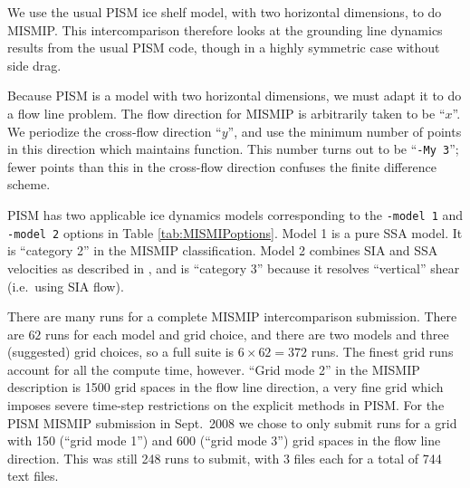 \documentclass[11pt,final]{amsart}
\begin{document}
We use the usual PISM ice shelf model, with two horizontal dimensions, to do MISMIP.  This intercomparison therefore looks at the grounding line dynamics results from the usual PISM code, though in a highly symmetric case without side drag.

Because PISM is a model with two horizontal dimensions, we must adapt it to do a flow line problem.  The flow direction for MISMIP is arbitrarily taken to be ``$x$''.  We periodize the cross-flow direction ``$y$'', and use the minimum number of points in this direction which maintains function.  This number turns out to be ``\verb|-My 3|''; fewer points than this in the cross-flow direction confuses the finite difference scheme.

PISM has two applicable ice dynamics models corresponding to the \verb|-model 1| and \verb|-model 2| options in Table \ref{tab:MISMIPoptions}.  Model 1 is a pure SSA model.  It is ``category 2'' in the MISMIP classification.  Model 2 combines SIA and SSA velocities as described in \cite{BBssasliding}, and is ``category 3'' because it resolves ``vertical'' shear (i.e.~using SIA flow).

There are many runs for a complete MISMIP intercomparison submission.  There are $62$ runs for each model and grid choice, and there are two models and three (suggested) grid choices, so a full suite is $6 \times 62 = 372$ runs.  The finest grid runs account for all the compute time, however.  ``Grid mode 2'' in the MISMIP description is 1500 grid spaces in the flow line direction, a very fine grid which imposes severe time-step restrictions on the explicit methods in PISM.  For the PISM MISMIP submission in Sept.~2008 we chose to only submit runs for a grid with 150 (``grid mode 1'') and 600 (``grid mode 3'') grid spaces in the flow line direction.  This was still 248 runs to submit, with 3 files each for a total of 744 text files.
 
\end{document}
